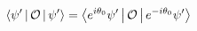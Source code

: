\documentclass[preview]{standalone}
\begin{document}
\begin{align*}
\Braket{\psi '|\mathcal{O}|\psi '} = \Braket{e^{i \theta_0}\psi ' |\mathcal{O}|e^{-i \theta_0}\psi '}
\end{align*}
\end{document}
